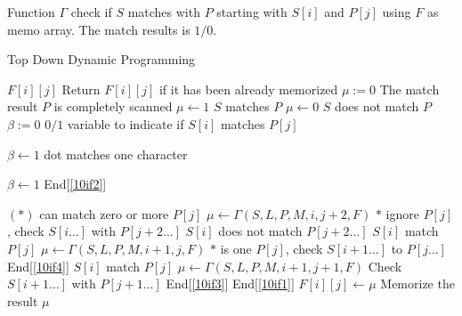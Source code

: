 Function $\Gamma$ check if $S$ matches with $P$ starting with $S[i]$ and $P[j]$ using $F$ as memo array. The match results is $1/0$.

\begin{algorithm}[H]
\caption{Top Down Dynamic Programming}
\begin{algorithmic}[1]
\State \Return $F[i][j]$ \Comment Return $F[i][j]$ if it has been already memorized
\EndIf
\State $\mu:=0$ \Comment The match result
 \Comment $P$ is completely scanned \label{10if1}
\State $\mu\gets 1$ \Comment $S$ matches $P$
\Else
\State $\mu\gets0$ \Comment $S$ does not match $P$
\EndIf
\State $\beta:=0$ \Comment $0/1$ variable to indicate if $S[i]$ matches $P[j]$

 \label{10if2}
\State $\beta \gets 1$
 \Comment dot matches one character

\end{algorithmic}
\end{algorithm}
\begin{algorithm}[H]
\begin{algorithmic}[1]
\State $\beta \gets 1$
\EndIf
\EndIf \Comment End[\ref{10if2}]

 $(\ast)$ can match zero or more $P[j]$ \label{10if3}
\State $\mu \gets \Gamma(S,L,P,M,i, j+2, F)$ \Comment $\ast$ ignore $P[j]$, check $S[i\ldots]$ with $P[j+2\ldots]$
 \Comment $S[i]$ does not match $P[j+2\ldots]$ \label{10if4}
 \Comment $S[i]$ match $P[j]$
\State $\mu \gets \Gamma(S,L,P,M,i+1, j, F)$ \Comment $\ast$ is one $P[j]$, check $S[i+1\ldots]$ to $P[j\ldots]$
\EndIf 
\EndIf \Comment End[\ref{10if4}]
\Else
{} \Comment $S[i]$ match $P[j]$
\State $\mu\gets \Gamma(S,L,P,M,i+1, j+1, F)$ \Comment Check $S[i+1\ldots]$ with $P[j+1\ldots]$
\EndIf 
\EndIf \Comment End[\ref{10if3}]
\EndIf \Comment End[\ref{10if1}]
\State $F[i][j] \gets \mu$ \Comment Memorize the result
\State \Return $\mu$
\EndFunction
\end{algorithmic}
\end{algorithm}